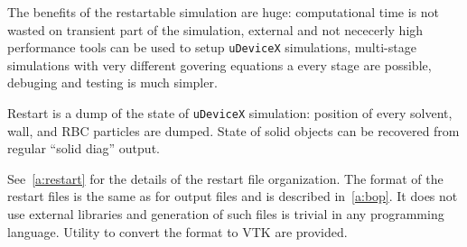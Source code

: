 The benefits of the restartable simulation are huge: computational
time is not wasted on transient part of the simulation, external and
not nececerly high performance tools can be used to
setup \texttt{uDeviceX} simulations, multi-stage simulations with very
different govering equations a every stage are possible, debuging and
testing is much simpler.

Restart is a dump of the state of \texttt{uDeviceX} simulation:
position of every solvent, wall, and RBC particles are dumped. State
of solid objects can be recovered from regular ``solid diag'' output.

See~\ref{a:restart} for the details of the restart file
organization. The format of the restart files is the same as for
output files and is described in~\ref{a:bop}. It does not use external
libraries and generation of such files is trivial in any programming
language. Utility to convert the format to VTK are provided.
